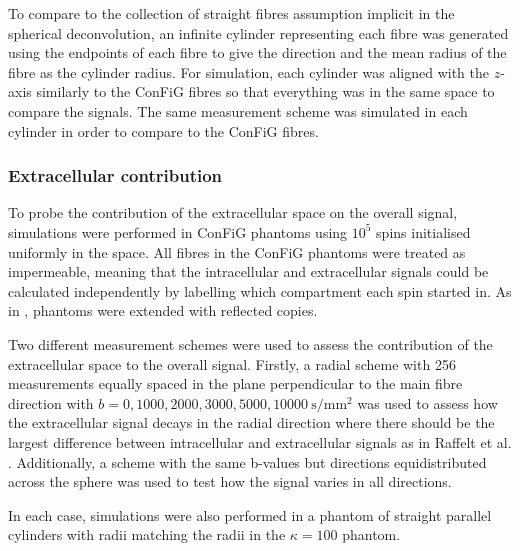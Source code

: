To compare to the collection of straight fibres assumption implicit in the spherical deconvolution, an infinite cylinder representing each fibre was generated using the endpoints of each fibre to give the direction and the mean radius of the fibre as the cylinder radius. For simulation, each cylinder was aligned with the $z$-axis similarly to the ConFiG fibres so that everything was in the same space to compare the signals. The same measurement scheme was simulated in each cylinder in order to compare to the \ac{ConFiG} fibres.


\subsubsection{Extracellular contribution}
\label{sec:frf_method_extra}
To probe the contribution of the extracellular space on the overall signal, simulations were performed in \ac{ConFiG} phantoms using $10^5$ spins initialised uniformly in the space.
All fibres in the \ac{ConFiG} phantoms were treated as impermeable, meaning that the intracellular and extracellular signals could be calculated independently by labelling which compartment each spin started in. As in , phantoms were extended with reflected copies.

Two different measurement schemes were used to assess the contribution of the extracellular space to the overall signal. Firstly, a radial scheme with 256 measurements equally spaced in the plane perpendicular to the main fibre direction with $b = 0, 1000, 2000, 3000, 5000, \SI{10000}{\second\per\milli\metre\squared}$ was used to assess how the extracellular signal decays in the radial direction where there should be the largest difference between intracellular and extracellular signals as in Raffelt et al. \cite{Raffelt2012}. Additionally, a scheme with the same b-values but directions equidistributed across the sphere was used to test how the signal varies in all directions.

In each case, simulations were also performed in a phantom of straight parallel cylinders with radii matching the radii in the $\kappa=100$ phantom.

